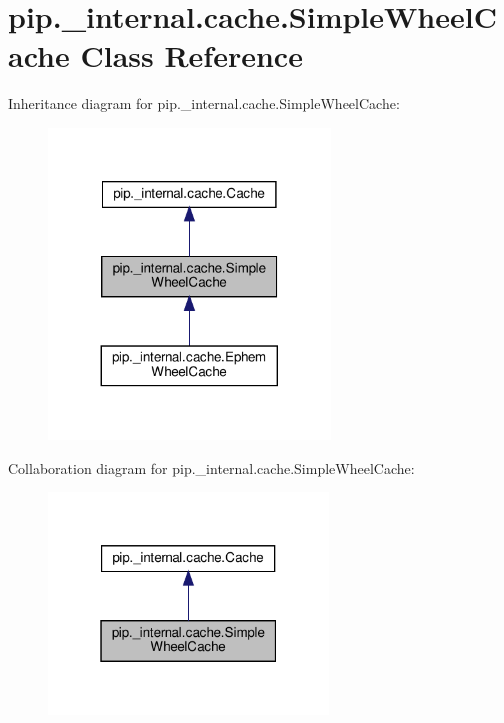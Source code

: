 \hypertarget{classpip_1_1__internal_1_1cache_1_1SimpleWheelCache}{}\section{pip.\+\_\+internal.\+cache.\+Simple\+Wheel\+Cache Class Reference}
\label{classpip_1_1__internal_1_1cache_1_1SimpleWheelCache}


Inheritance diagram for pip.\+\_\+internal.\+cache.\+Simple\+Wheel\+Cache\+:
\nopagebreak
\begin{figure}[H]
\begin{center}
\leavevmode
\includegraphics[width=212pt]{classpip_1_1__internal_1_1cache_1_1SimpleWheelCache__inherit__graph}
\end{center}
\end{figure}


Collaboration diagram for pip.\+\_\+internal.\+cache.\+Simple\+Wheel\+Cache\+:
\nopagebreak
\begin{figure}[H]
\begin{center}
\leavevmode
\includegraphics[width=211pt]{classpip_1_1__internal_1_1cache_1_1SimpleWheelCache__coll__graph}
\end{center}
\end{figure}
